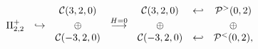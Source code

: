 \begin{equation}
\left.
\begin{array}{ccccccc}
&& {\cal C}(3,2,0)& &{\cal C}(3,2,0)&\hookleftarrow &{\cal P}^{>}(0,2)\\
\Pi^+_{2,2} &\hookrightarrow &\oplus&\stackrel{H=0}{\longrightarrow} & \oplus  & &\oplus\\
&& {\cal C}(-3,2,0)& & {\cal C}(-3,2,0) &\hookleftarrow &{\cal
P}^{<}(0,2),\\
\end{array}
\right.
\end{equation}

